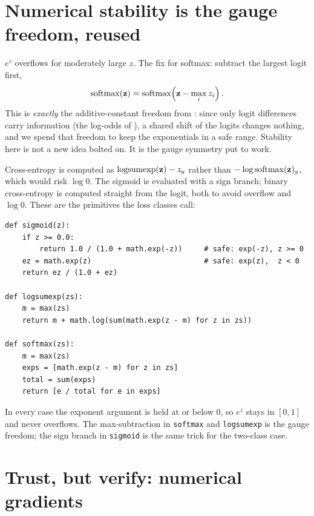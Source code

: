 
\section{Numerical stability is the gauge freedom, reused}\label{sec:stability}

$e^z$ overflows for moderately large $z$. The fix for softmax: subtract
the largest logit first,
\[
  \operatorname{softmax}(\mathbf{z}) = \operatorname{softmax}\!\left(\mathbf{z} - \max_i z_i\right).
\]
This is \emph{exactly} the additive-constant freedom from
: since only logit differences carry
information (the log-odds of ), a shared shift of the
logits changes nothing, and we spend that freedom to keep the
exponentials in a safe range. Stability here is not a new idea bolted on. It is the gauge
symmetry put to work.

Cross-entropy is computed as $\mathrm{logsumexp}(\mathbf{z}) - z_y$ rather than
$-\log \mathrm{softmax}(\mathbf{z})_y$, which would risk $\log 0$. The sigmoid
is evaluated with a sign branch; binary cross-entropy is computed straight
from the logit, both to avoid overflow and $\log 0$. These are the
primitives the loss classes call:

\begin{lstlisting}
def sigmoid(z):
    if z >= 0.0:
        return 1.0 / (1.0 + math.exp(-z))     # safe: exp(-z), z >= 0
    ez = math.exp(z)                          # safe: exp(z),  z < 0
    return ez / (1.0 + ez)

def logsumexp(zs):
    m = max(zs)
    return m + math.log(sum(math.exp(z - m) for z in zs))

def softmax(zs):
    m = max(zs)
    exps = [math.exp(z - m) for z in zs]
    total = sum(exps)
    return [e / total for e in exps]
\end{lstlisting}

In every case the exponent argument is held at or below $0$, so $e^z$
stays in $[0, 1]$ and never overflows. The max-subtraction in
\texttt{softmax} and \texttt{logsumexp} is the 
gauge freedom; the sign branch in \texttt{sigmoid} is the same trick for
the two-class case.

\section{Trust, but verify: numerical gradients}\label{sec:gradcheck}

